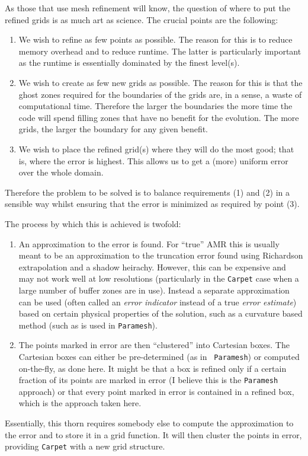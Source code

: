 As those that use mesh refinement will know, the question of where to
put the refined grids is as much art as science. The crucial points
are the following:
\begin{enumerate}
\item We wish to refine as few points as possible. The reason for this
  is to reduce memory overhead and to reduce runtime. The latter is
  particularly important as the runtime is essentially dominated by
  the finest level(s).
\item We wish to create as few new grids as possible. The reason for
  this is that the ghost zones required for the boundaries of the
  grids are, in a sense, a waste of computational time. Therefore the
  larger the boundaries the more time the code will spend filling
  zones that have no benefit for the evolution. The more grids, the
  larger the boundary for any given benefit.
\item We wish to place the refined grid(s) where they will do the most
  good; that is, where the error is highest. This allows us to get a
  (more) uniform error over the whole domain.
\end{enumerate}
Therefore the problem to be solved is to balance requirements (1) and
(2) in a sensible way whilst ensuring that the error is minimized as
required by point (3).

The process by which this is achieved is twofold:
\begin{enumerate}
\item An approximation to the error is found. For ``true'' AMR this is
  usually meant to be an approximation to the truncation error found
  using Richardson extrapolation and a shadow heirachy. However, this
  can be expensive and may not work well at low resolutions
  (particularly in the {\tt Carpet} case when a large number of buffer
  zones are in use). Instead a separate approximation can be used
  (often called an {\em error indicator} instead of a true {\em error
    estimate}) based on certain physical properties of the solution,
  such as a curvature based method (such as is used in {\tt Paramesh}).
\item The points marked in error are then ``clustered'' into Cartesian
  boxes. The Cartesian boxes can either be pre-determined (as in {\tt
    Paramesh}) or computed on-the-fly, as done here. It might be that
  a box is refined only if a certain fraction of its points are marked
  in error (I believe this is the {\tt Paramesh} approach) or that
  every point marked in error is contained in a refined box, which is
  the approach taken here.
\end{enumerate}
Essentially, this thorn requires somebody else to compute the
approximation to the error and to store it in a grid function. It will
then cluster the points in error, providing {\tt Carpet} with a new
grid structure.

